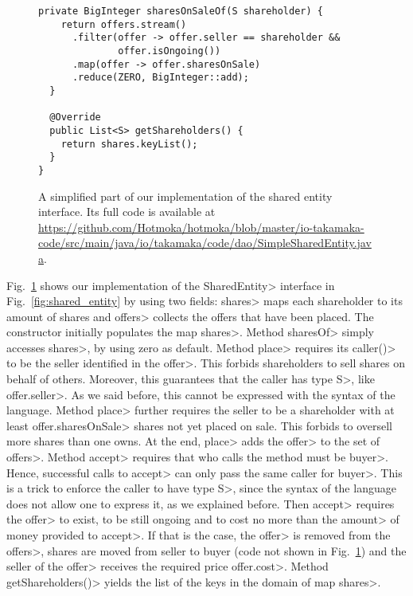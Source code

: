 \begin{figure}[htbp]
\begin{center}
\begin{lstlisting}[language=Takamaka]
  private BigInteger sharesOnSaleOf(S shareholder) {
    return offers.stream()
      .filter(offer -> offer.seller == shareholder && 
              offer.isOngoing())
      .map(offer -> offer.sharesOnSale)
      .reduce(ZERO, BigInteger::add);
  }

  @Override
  public List<S> getShareholders() {
    return shares.keyList();
  }
}
    \end{lstlisting}
  \end{center}
  \caption{A simplified part of our implementation of the shared entity interface.
  Its full code is available at \url{https://github.com/Hotmoka/hotmoka/blob/master/io-takamaka-code/src/main/java/io/takamaka/code/dao/SimpleSharedEntity.java}.}\label{fig:simple_shared_entity}
\end{figure}

Fig.~\ref{fig:simple_shared_entity} shows our implementation of the \<SharedEntity> interface
in Fig.~\ref{fig:shared_entity}
by using two fields: \<shares> maps each shareholder to its amount of shares and
\<offers> collects the offers that have been placed.
The constructor initially populates the map \<shares>.
Method \<sharesOf> simply accesses
\<shares>, by using zero as default. Method \<place> requires its \<caller()> to be
the seller identified in the \<offer>. This forbids shareholders to sell shares on behalf of others.
Moreover, this guarantees that the caller has type \<S>, like \<offer.seller>.
As we said before, this cannot be expressed with the syntax of the language.
Method \<place> further requires the seller to be a shareholder with at least \<offer.sharesOnSale>
shares not yet placed on sale. This forbids to oversell more shares
than one owns. At the end, \<place> adds the \<offer> to the set of \<offers>.
Method \<accept> requires that who calls the method must be \<buyer>. Hence, successful
calls to \<accept> can only pass the same caller for \<buyer>. This is a trick to enforce the
caller to have type \<S>, since the syntax of the language does not allow one to express it,
as we explained before. Then \<accept> requires the \<offer> to exist, to be still ongoing
and to cost no more than the \<amount> of money provided to \<accept>. If that is the case,
the \<offer> is removed from the \<offers>, shares are moved from seller to buyer (code not
shown in Fig.~\ref{fig:simple_shared_entity}) and the seller of the \<offer>
receives the required price \<offer.cost>.
Method \<getShareholders()> yields the list of the keys in the domain of map \<shares>.

